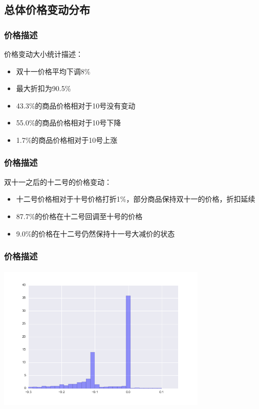 \documentclass{beamer}
\begin{document}
\subsection{总体价格变动分布}
\begin{frame}
\frametitle{价格描述}
价格变动大小统计描述：
\begin{itemize}
  \item 双十一价格平均下调8\%
  \item 最大折扣为90.5\%
  \item 43.3\%的商品价格相对于10号没有变动
  \item 55.0\%的商品价格相对于10号下降
  \item 1.7\%的商品价格相对于10号上涨
\end{itemize}
\end{frame}
\begin{frame}
\frametitle{价格描述}
双十一之后的十二号的价格变动：
\begin{itemize}
  \item 十二号价格相对于十号价格打折1\%，部分商品保持双十一的价格，折扣延续
  \item 87.7\%的价格在十二号回调至十号的价格
  \item 9.0\%的价格在十二号仍然保持十一号大减价的状态
\end{itemize}
\end{frame}
\begin{frame}
\frametitle{价格描述}
\includegraphics[width=10cm,height=7cm]{all_pr.png}
\end{frame}
\end{document}
